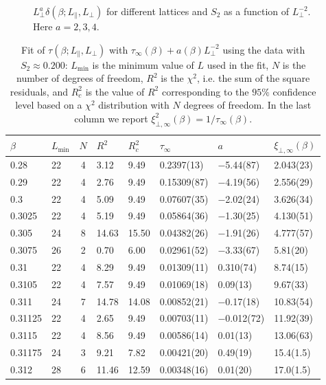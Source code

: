 \documentclass[12pt]{article}
\begin{document}
\begin{figure}[!thb]
  \begin{center}
  \end{center}
\caption{$L_\bot^a \delta(\beta;L_\|,L_\bot)$ for different lattices and 
  $S_2$ as a function of
  $L_\bot^{-2}$. Here $a=2,3,4$.}
  \label{fig:various-s2}
\end{figure}
\begin{table}
 \centering
\begin{tabular}[c]{llclllll}
\hline
\hfil$\beta$\hfil & \hfil $L_{\text{min}}$ \hfil & \hfil $ N$ \hfil & \hfil $R^2$ \hfil &  \hfil $R^2_c$ \hfil & \hfil
$\tau_\infty$ \hfil & \hfil $a$\hfil & 
$\xi_{\bot,\infty}(\beta)$\\
\hline
0.28     & 22 & 4 &  3.12  & 9.49  & 0.2397(13)   &    $-$5.44(87) &
       2.043(23) \\
0.29     & 22 & 4 &  2.76  & 9.49  & 0.15309(87)  &    $-$4.19(56) &
       2.556(29) \\
0.3      & 22 & 4 &  5.09  & 9.49  & 0.07607(35)  &    $-$2.02(24) &
       3.626(34) \\
0.3025   & 22 & 4 &  5.19  & 9.49  & 0.05864(36)  &    $-$1.30(25) &
       4.130(51) \\
0.305    & 24 & 8 &  14.63 & 15.50 & 0.04382(26)  &    $-$1.91(26) &
       4.777(57) \\
0.3075   & 26 & 2 &  0.70  & 6.00  & 0.02961(52)  &    $-$3.33(67) &
       5.81(20)  \\
0.31     & 22 & 4 &  8.29  & 9.49  & 0.01309(11)  &    0.310(74) &
       8.74(15) \\
0.3105   & 22 & 4 &  7.57  & 9.49  & 0.01069(18)  &     0.09(13) &
       9.67(33)\\
0.311    & 24 & 7 &  14.78 & 14.08 & 0.00852(21) &    $-$0.17(18) &
        10.83(54)\\
0.31125  & 22 & 4 &  2.65  & 9.49  & 0.00703(11)  &    $-$0.012(72) &
       11.92(39) \\ 
0.3115   & 22 & 4 &  8.56  & 9.49  & 0.00586(14)  &    0.01(13) &
       13.06(63) \\
0.31175  & 24 & 3 &  9.21  & 7.82  & 0.00421(20)  &   0.49(19) &
       15.4(1.5) \\
0.312    & 28 & 6 &  11.46  & 12.59 & 0.00348(16)  &   0.01(20) &
        17.0(1.5) \\
\hline
\end{tabular}
  \caption{Fit of $\tau(\beta;L_\|,L_\bot)$ with 
   $\tau_\infty(\beta) + a(\beta) L_\bot^{-2}$ using the data with
    $S_2\approx 0.200$: $L_{\text{min}}$ is the minimum value of $L$
    used in the fit, $N$ is the number of degrees of freedom, $R^2$
    is the $\chi^2$, i.e. the sum of the square residuals,
    and $R^2_c$ is the value
    of $R^2$ corresponding to the $95\%$ confidence level based on a $\chi^2$
    distribution with $N$ degrees of freedom. In the last column we report
    $\xi_{\bot,\infty}^2(\beta) = 1/\tau_\infty(\beta)$.}
  \label{tab:fit_tauelle}
\end{table}
\end{document}
